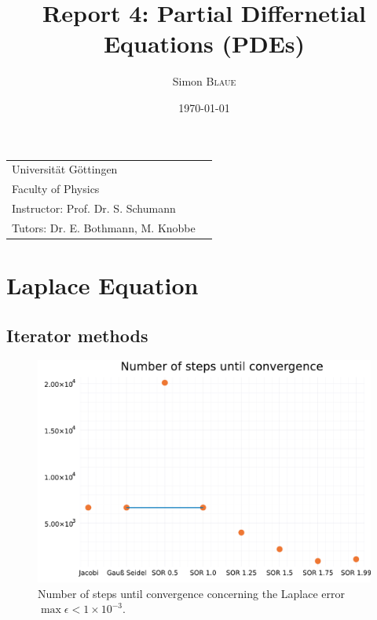 \documentclass[
	a4paper, %
	10pt, %
]{CSUniSchoolLabReport}
\title{Report 4: Partial Differnetial Equations (PDEs)} %
\author{Simon \textsc{Blaue}} %
\date{\today} %
\begin{document}
\maketitle %


\begin{tabular}{l r}
	Universität Göttingen \\ %
	Faculty of Physics \\
	Instructor: Prof. Dr. S. Schumann \\
	Tutors: Dr. E. Bothmann, M. Knobbe \\ %
\end{tabular}



\vspace*{50px}

\section{Laplace Equation}

\subsection{Iterator methods}

\begin{figure}[H]
	\centering
	\includegraphics[width=\textwidth]{../saves/number_of_convergence_steps.pdf}
	\caption{Number of steps until convergence concerning the Laplace error $\max\epsilon<1\times 10^{-3}$.}
\end{figure}
\end{document}
